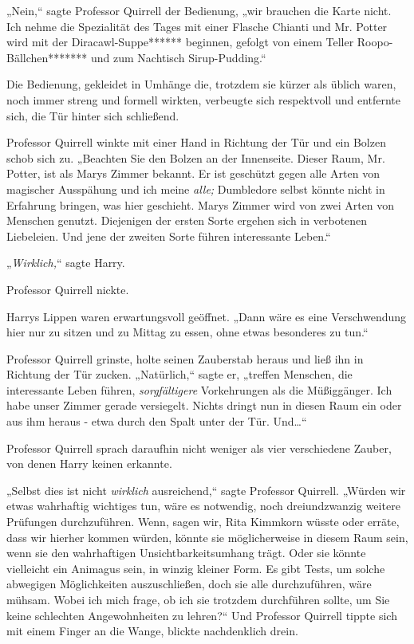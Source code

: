 {„Nein,“ sagte Professor Quirrell der Bedienung, „wir brauchen die Karte nicht. Ich nehme die Spezialität des Tages mit einer Flasche Chianti und Mr. Potter wird mit der Diracawl-Suppe****** beginnen, gefolgt von einem Teller Roopo-Bällchen******* und zum Nachtisch Sirup-Pudding.“

Die Bedienung, gekleidet in Umhänge die, trotzdem sie kürzer als üblich waren, noch immer streng und formell wirkten, verbeugte sich respektvoll und entfernte sich, die Tür hinter sich schließend.

Professor Quirrell winkte mit einer Hand in Richtung der Tür und ein Bolzen schob sich zu. „Beachten Sie den Bolzen an der Innenseite. Dieser Raum, Mr. Potter, ist als Marys Zimmer bekannt. Er ist geschützt gegen alle Arten von magischer Ausspähung und ich meine \emph{alle;} Dumbledore selbst könnte nicht in Erfahrung bringen, was hier geschieht. Marys Zimmer wird von zwei Arten von Menschen genutzt. Diejenigen der ersten Sorte ergehen sich in verbotenen Liebeleien. Und jene der zweiten Sorte führen interessante Leben.“

„\emph{Wirklich,}“ sagte Harry.

Professor Quirrell nickte.

Harrys Lippen waren erwartungsvoll geöffnet. „Dann wäre es eine Verschwendung hier nur zu sitzen und zu Mittag zu essen, ohne etwas besonderes zu tun.“

Professor Quirrell grinste, holte seinen Zauberstab heraus und ließ ihn in Richtung der Tür zucken. „Natürlich,“ sagte er, „treffen Menschen, die interessante Leben führen, \emph{sorgfältigere} Vorkehrungen als die Müßiggänger. Ich habe unser Zimmer gerade versiegelt. Nichts dringt nun in diesen Raum ein oder aus ihm heraus - etwa durch den Spalt unter der Tür. Und…“

Professor Quirrell sprach daraufhin nicht weniger als vier verschiedene Zauber, von denen Harry keinen erkannte.

„Selbst dies ist nicht \emph{wirklich} ausreichend,“ sagte Professor Quirrell. „Würden wir etwas wahrhaftig wichtiges tun, wäre es notwendig, noch dreiundzwanzig weitere Prüfungen durchzuführen. Wenn, sagen wir, Rita Kimmkorn wüsste oder erräte, dass wir hierher kommen würden, könnte sie möglicherweise in diesem Raum sein, wenn sie den wahrhaftigen Unsichtbarkeitsumhang trägt. Oder sie könnte vielleicht ein Animagus sein, in winzig kleiner Form. Es gibt Tests, um solche abwegigen Möglichkeiten auszuschließen, doch sie alle durchzuführen, wäre mühsam. Wobei ich mich frage, ob ich sie trotzdem durchführen sollte, um Sie keine schlechten Angewohnheiten zu lehren?“ Und Professor Quirrell tippte sich mit einem Finger an die Wange, blickte nachdenklich drein.

}
